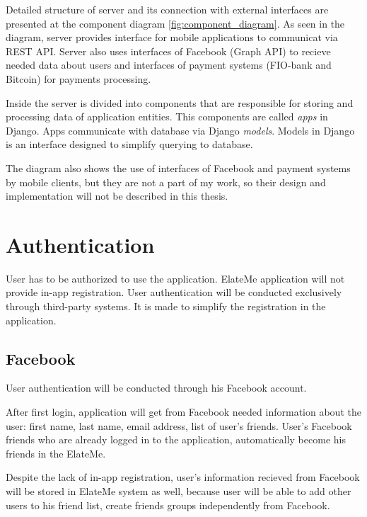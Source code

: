 Detailed structure of server and its connection with external interfaces are presented at the component diagram
\ref{fig:component_diagram}. As seen in the diagram, server provides interface for mobile applications to communicat via
REST API. Server also uses interfaces of Facebook (Graph API) to recieve needed data about users and interfaces of
payment systems (FIO-bank and Bitcoin) for payments processing.

Inside the server is divided into components that are responsible for storing and processing data of application
entities. This components are called \textit{apps} in Django. Apps communicate with database via Django \textit{models}.
Models in Django is an interface designed to simplify querying to database.


The diagram also shows the use of interfaces of Facebook and payment systems by mobile clients, but they are not a part
of my work, so their design and implementation will not be described in this thesis.



\section{Authentication}
User has to be authorized to use the application. ElateMe application will not provide in-app registration. User
authentication will be conducted exclusively through third-party systems. It is made to simplify the
registration in the application.


\subsection{Facebook}
User authentication will be conducted through his Facebook account.

After first login, application will get from Facebook needed information about the user: first name, last name,
email address, list of user's friends. User's Facebook friends who are already logged in to the application,
automatically become his friends in the ElateMe.

Despite the lack of in-app registration, user's information recieved from Facebook will be stored in ElateMe system
as well, because user will be able to add other users to his friend list, create friends groups independently from
Facebook.



